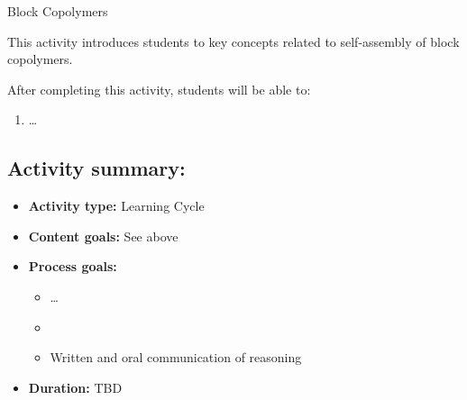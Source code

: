 %
%
%
%

\renewcommand{\figpath}{content/polymphys/extension-topics/block-copolymers/figs}
\renewcommand{\labelbase}{block-copolymers}

\begin{activity}[extension]{Block Copolymers}

\begin{instructornotes}

	This activity introduces students to key concepts related to self-assembly of block copolymers.
	
	After completing this activity, students will be able to:
			\begin{enumerate}
				\item \dots
			\end{enumerate}
			
	\subsection*{Activity summary:}
	\begin{itemize}
		\item \textbf{Activity type:} Learning Cycle
		\item \textbf{Content goals:} See above %
		\item \textbf{Process goals:} %
			\begin{itemize}
				\item \dots%
				\item %
				\item Written and oral communication of reasoning
			\end{itemize}
		\item \textbf{Duration:} TBD%
			

\end{itemize}
\end{instructornotes}
\end{activity}
